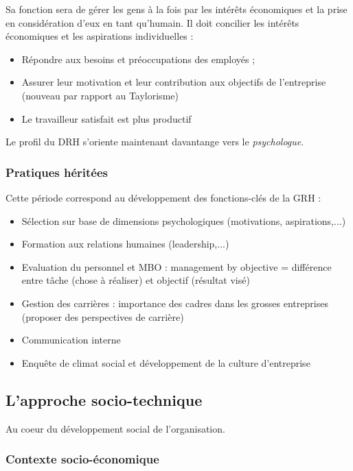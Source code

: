 \documentclass[12pt]{article}
\begin{document}
	  Sa fonction sera de gérer les gens à la fois par les intérêts économiques et la prise en considération d'eux en tant qu'humain. Il doit concilier les intérêts économiques et les aspirations individuelles :
	  
	  \begin{itemize}
	   \item Répondre aux besoins et préoccupations des employés ;
	   \item Assurer leur motivation et leur contribution aux objectifs de l'entreprise (nouveau par rapport au Taylorisme)
	   \item Le travailleur satisfait est plus productif
	  \end{itemize}
	  
	  Le profil du DRH s'oriente maintenant davantange vers le \emph{psychologue}.
	  
	  \subsubsection{Pratiques héritées}
	  
	  Cette période correspond au développement des fonctions-clés de la GRH :
	  
	  \begin{itemize}
	   \item Sélection sur base de dimensions psychologiques (motivations, aspirations,...)
	   \item Formation aux relations humaines (leadership,...)
	   \item Evaluation du personnel et MBO : management by objective = différence entre tâche (chose à réaliser) et objectif (résultat visé)
	   \item Gestion des carrières : importance des cadres dans les grosses entreprises (proposer des perspectives de carrière)
	   \item Communication interne
	   \item Enquête de climat social et développement de la culture d'entreprise
	  \end{itemize}
	  
	\subsection{L'approche socio-technique}
	Au coeur du développement social de l'organisation.
	
	\subsubsection{Contexte socio-économique}
	
\end{document}
